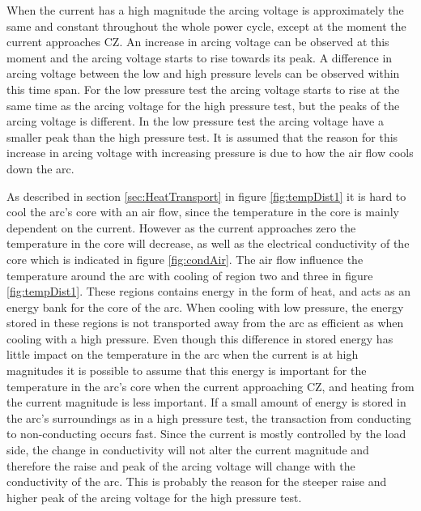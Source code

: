 \documentclass[10pt,a4paper,twoside]{article}
\begin{document}
When the current has a high magnitude the arcing voltage is approximately the same and constant throughout the whole power cycle, except at the moment the current approaches CZ. An increase in arcing voltage can be observed at this moment and the arcing voltage starts to rise towards its peak. A difference in arcing voltage between the low and high pressure levels can be observed within this time span. For the low pressure test the arcing voltage starts to rise at the same time as the arcing voltage for the high pressure test, but the peaks of the arcing voltage is different. In the low pressure test the arcing voltage have a smaller peak than the high pressure test. It is assumed that the reason for this increase in arcing voltage with increasing pressure is due to how the air flow cools down the arc.

As described in section \ref{sec:HeatTransport} in figure \ref{fig:tempDist1} it is hard to cool the arc's core with an air flow, since the temperature in the core is mainly dependent on the current. However as the current approaches zero the temperature in the core will decrease, as well as the electrical conductivity of the core which is indicated in figure \ref{fig:condAir}. The air flow influence the temperature around the arc with cooling of region two and three in figure \ref{fig:tempDist1}. These regions contains energy in the form of heat, and acts as an energy bank for the core of the arc. When cooling with low pressure, the energy stored in these regions is not transported away from the arc as efficient as when cooling with a high pressure. Even though this difference in stored energy has little impact on the temperature in the arc when the current is at high magnitudes it is possible to assume that this energy is important for the temperature in the arc's core when the current approaching CZ, and heating from the current magnitude is less important. If a small amount of energy is stored in the arc's surroundings as in a high pressure test, the transaction from conducting to non-conducting occurs fast. Since the current is mostly controlled by the load side, the change in conductivity will not alter the current magnitude and therefore the raise and peak of the arcing voltage will change with the conductivity of the arc. This is probably the reason for the steeper raise and higher peak of the arcing voltage for the high pressure test.
\end{document}
